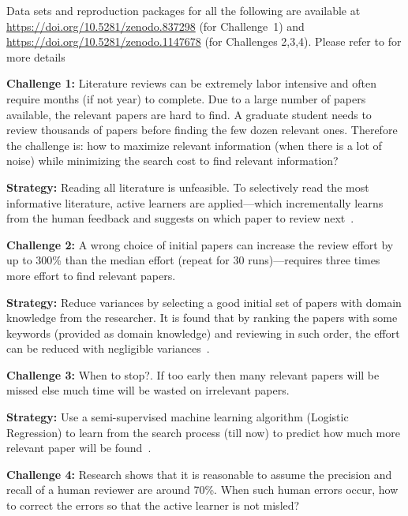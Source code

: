\documentclass[sigconf]{acmart}
\begin{document}
 Data sets and reproduction packages for all the following are available at \url{https://doi.org/10.5281/zenodo.837298} (for Challenge~1) and 
\url{https://doi.org/10.5281/zenodo.1147678} (for Challenges 2,3,4). Please refer to \cite{yu2016finding, YuM17} for more details
   
\vspace{1.0ex}
\noindent\textbf{Challenge 1: }
Literature reviews can be extremely labor intensive and often require months (if not year) to complete. Due to a large number of papers available, the relevant papers are hard to find. A graduate student needs to review thousands of papers before finding the few dozen relevant ones.
Therefore the challenge is: how to maximize relevant information (when there is a lot of noise) while minimizing the search cost to find relevant information?

\noindent\textbf{Strategy: }
  Reading all literature is unfeasible. To selectively read the most informative literature, active learners are applied---which incrementally learns from the human feedback and suggests on which paper to review next~\cite{YuM17a}.
   
\vspace{1.0ex}
\noindent\textbf{Challenge 2: }
A wrong choice of initial papers can increase the review effort by up to 300\% than the median effort (repeat for 30 runs)---requires three times more effort to find relevant papers. 

\noindent\textbf{Strategy: }
Reduce variances by selecting a good initial set of papers with domain knowledge from the researcher. It is found that by ranking the papers with some keywords (provided as domain knowledge) and reviewing in such order, the effort can be reduced with negligible variances~\cite{YuM17}.
   
\vspace{1.0ex}
\noindent\textbf{Challenge 3: }
When to stop?. If too early then many relevant papers will be missed
else much time will be wasted on irrelevant papers. 

\noindent\textbf{Strategy: }
Use a semi-supervised machine learning algorithm (Logistic Regression) to learn from the search process (till now) to predict how much more relevant paper will be found~\cite{YuM17}. 

\vspace{1.0ex}
\noindent\textbf{Challenge 4: }
Research shows that it is reasonable to assume the precision and recall of a human reviewer are around 70\%. When such human errors occur, how to correct the errors so that the active learner is not misled?
\end{document}

